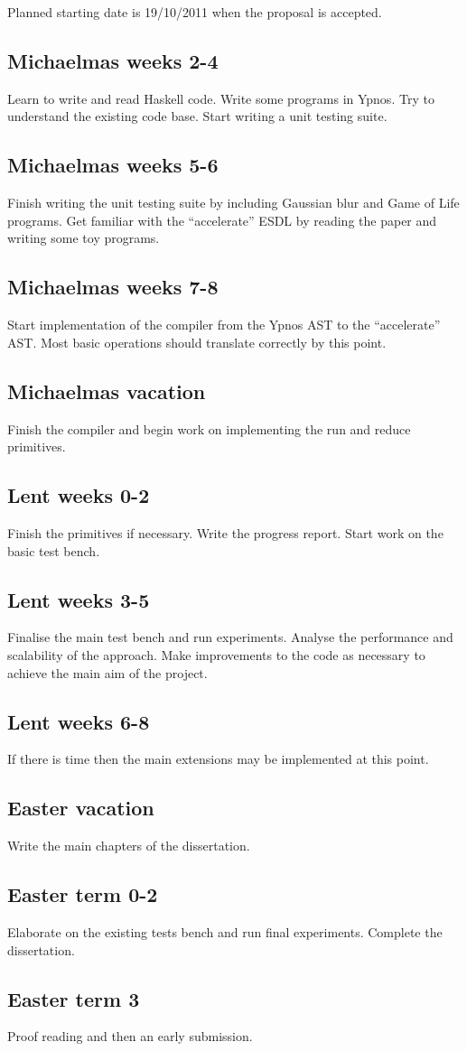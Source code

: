 Planned starting date is 19/10/2011 when the proposal is accepted.

\subsection*{Michaelmas weeks 2-4} Learn to write and read Haskell code. Write 
some programs in Ypnos. Try to understand the existing code base. Start writing 
a unit testing suite.

\subsection*{Michaelmas weeks 5-6} Finish writing the unit testing suite by 
including Gaussian blur and Game of Life programs. Get familiar with the 
``accelerate'' ESDL by reading the paper and writing some toy programs. 

\subsection*{Michaelmas weeks 7-8} Start implementation of the compiler from 
the Ypnos AST to the ``accelerate'' AST. Most basic operations should translate 
correctly by this point.

\subsection*{Michaelmas vacation} Finish the compiler and begin work on 
implementing the run and reduce primitives.

\subsection*{Lent weeks 0-2} Finish the primitives if necessary. Write the 
progress report. Start work on the basic test bench.

\subsection*{Lent weeks 3-5} Finalise the main test bench and run experiments.  
Analyse the performance and scalability of the approach. Make improvements to 
the code as necessary to achieve the main aim of the project. 

\subsection*{Lent weeks 6-8} If there is time then the main extensions may be 
implemented at this point.

\subsection*{Easter vacation} Write the main chapters of the dissertation.

\subsection*{Easter term 0-2} Elaborate on the existing tests bench and run 
final experiments. Complete the dissertation.

\subsection*{Easter term 3} Proof reading and then an early submission.  
